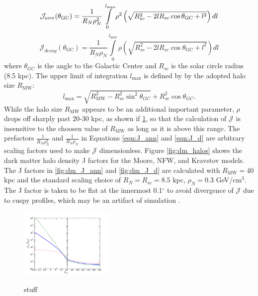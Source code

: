 \begin{equation}
\mathcal{J}_{ann}(\theta_\textrm{GC})=\frac{1}{R_N\rho_N^2}\int\limits_0^{l_\textrm{max}} \rho^2 \left(\sqrt{R_{sc}^2-2lR_{sc}\cos{\theta_\textrm{GC}}+l^2}\right)dl\\
\label{eqn:J_ann}
\end{equation}
\begin{equation}
\mathcal{J}_{decay}(\theta_\textrm{GC})=\frac{1}{R_N\rho_N}\int\limits_0^{l_\textrm{max}} \rho \left(\sqrt{R_{sc}^2-2lR_{sc}\cos{\theta_\textrm{GC}}+l^2}\right)dl
\label{eqn:J_d}
\end{equation}
where $\theta_{GC}$ is the angle to the Galactic Center and $R_{sc}$ is the solar circle radius (8.5 kpc).  The upper limit of integration $l_\textrm{max}$ is defined by by the adopted halo size $R_{\textrm{MW}}$:
\begin{equation}
l_\textrm{max}=\sqrt{R^2_\textrm{MW}-R^2_{sc}\sin^2 \theta_{GC}} + R^2_{sc}\cos{\theta_{GC}}.
\label{eqn:l_max}
\end{equation}
While the halo size $R_{\textrm{MW}}$ appears to be an additional important parameter, $\rho$ drops off sharply past 20-30 kpc, as shown if \ref{fig:dm_density}, so that the calculation of $\mathcal{J}$ is insensitive to the choosen value of $R_{\textrm{MW}}$ as long as it is above this range.  The prefactors $\frac{1}{R_N\rho_N^2}$ and $\frac{1}{R_N\rho_N}$ in Equations \ref{eqn:J_ann} and \ref{eqn:J_d} are arbitrary scaling factors used to make $\mathcal{J}$ dimensionless.  Figure \ref{fig:dm_halos} shows the dark matter halo density J factors for the Moore, NFW, and Kravstov models.  The J factors in \ref{fig:dm_J_ann} and \ref{fig:dm_J_d} are calculated with $R_{\textrm{MW}}=40$ kpc and the standard scaling choice of $R_N=R_{sc}=8.5$ kpc, $\rho_N=0.3$ GeV/cm$^3$.  The J factor is taken to be flat at the innermost 0.1$^\circ$ to avoid divergence of $\mathcal{J}$ due to cuspy profiles, which may be an artifact of simulation \cite{Yuksel:2007jx}. 
\begin{figure}
 		\includegraphics[width=0.4\textwidth]{figures/DM_J_ann.pdf}
		\label{fig:dm_density}
\caption{stuff}
\end{figure}

